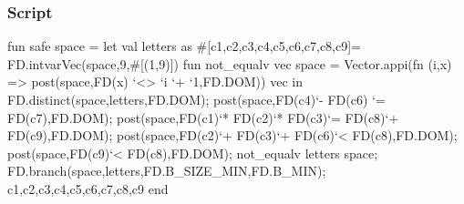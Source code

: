 \documentclass[a4paper]{scrartcl}
\begin{document}
\subsubsection{Script}


\begin{myverbatim}
fun safe space = 
   let
      val letters as #[c1,c2,c3,c4,c5,c6,c7,c8,c9]= 
          FD.intvarVec(space,9,#[(1,9)])
      fun not_equalv vec space = Vector.appi(fn (i,x) => 
                     post(space,FD(x) `<> `i `+ `1,FD.DOM)) vec
   in
      FD.distinct(space,letters,FD.DOM);
      post(space,FD(c4)`- FD(c6) `= FD(c7),FD.DOM);
      post(space,FD(c1)`* FD(c2)`* FD(c3)`= FD(c8)`+ FD(c9),FD.DOM);        
      post(space,FD(c2)`+ FD(c3)`+ FD(c6)`< FD(c8),FD.DOM);
      post(space,FD(c9)`< FD(c8),FD.DOM);
      not_equalv letters space;
      FD.branch(space,letters,FD.B_SIZE_MIN,FD.B_MIN);
      {c1,c2,c3,c4,c5,c6,c7,c8,c9}
    end 

\end{myverbatim}
\end{document}
